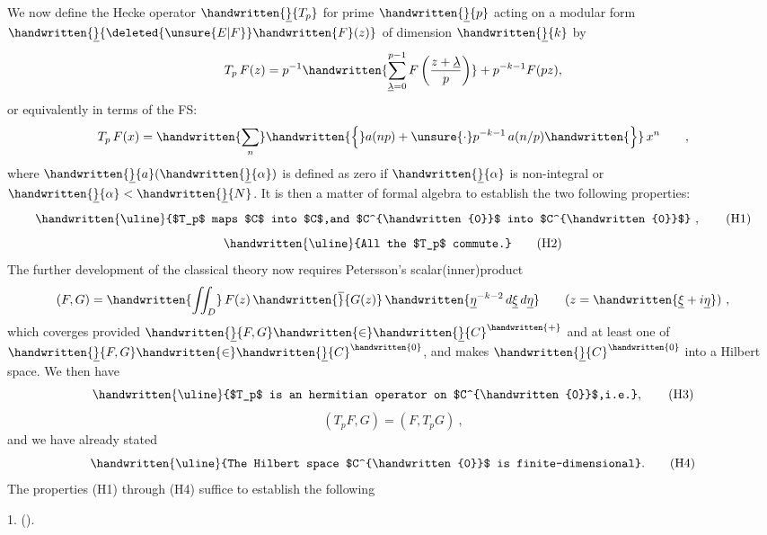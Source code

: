 We now define the Hecke operator $\handwritten{\underline}{T_p}$ for prime $\handwritten{\underline}{p}$ acting on a modular form $\handwritten{\underline}{\deleted{\unsure{E|F}}\handwritten{F}(z)}$ of dimension $\handwritten{\underline}{k}$ by
\[
T_p\,F(z)=p^{-1}\handwritten{\sum_{\underline{\lambda}=0}^{p-1}F\left(\frac{z+\underline{\lambda}}{p}\right)}
+p^{-k-1}F(pz),
\]
or equivalently in terms of the FS:
\[
T_p\,F(x)=\handwritten{\sum_n}\handwritten{\Bigl\{}a(np)+\unsure{\cdot}p^{-k-1}\,a(n/p)\handwritten{\Bigr\}}\,x^n\qquad ,
\]
where $\handwritten{\underline}{a}(\handwritten{\underline}{\alpha})$ is defined as zero if $\handwritten{\underline}{\alpha}$ is non-integral or $\handwritten{\underline}{\alpha}<\handwritten{\underline}{N}$. It is then a matter of formal algebra to establish the two following properties:
\[
\text{\handwritten{\uline}{$T_p$ maps $C$ into $C$,and $C^{\handwritten{0}}$ into $C^{\handwritten{0}}$}}\ ,
\tag*{(H1)}
\]
\[
\text{\handwritten{\uline}{All the $T_p$ commute.}}
\tag*{(H2)}
\]
The further development of the classical theory now requires Petersson's scalar(inner)product
\[
(F,G)=\handwritten{\iint_{D}}\,F(z)\,\handwritten{\overline}{G(z)}\,\handwritten{\underline{\eta}^{-k-2}\,d\underline{\xi}\,d\underline{\eta}}
\qquad (z=\handwritten{\underline{\xi}+i\underline{\eta}})\ ,
\]
which coverges provided $\handwritten{\underline}{F,G}\handwritten{\in}\handwritten{\underline}{C}^{\handwritten{+}}$ and at least one of $\handwritten{\underline}{F,G}\handwritten{\in}\handwritten{\underline}{C}^{\handwritten{0}}$, and makes $\handwritten{\underline}{C}^{\handwritten{0}}$ into a Hilbert space. We then have
\[
\text{\handwritten{\uline}{$T_p$ is an hermitian operator on $C^{\handwritten{0}}$,i.e.}}, 
\tag*{(H3)}
\]
\[
(T_pF,G)=(F,T_pG)\ ,
\]
and we have already stated
\[
\text{\handwritten{\uline}{The Hilbert space $C^{\handwritten{0}}$ is finite-dimensional}.}
\tag*{(H4)}
\]
The properties (H1) through (H4) suffice to establish the following

 1. ().


